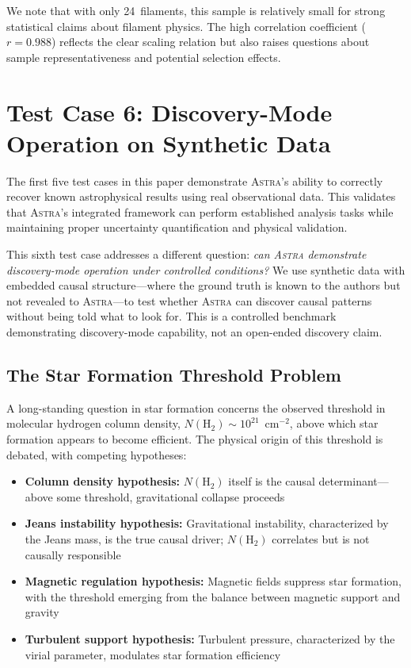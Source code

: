 \documentclass[fleqn,usenatbib]{mnras}
\newcommand{\astra}{\textsc{Astra}\xspace}
\newcommand{\nh}{N(\mathrm{H}_2)}
\begin{document}
We note that with only 24~filaments, this sample is relatively small for strong statistical claims about filament physics.
The high correlation coefficient ($r = 0.988$) reflects the clear scaling relation but also raises questions about sample representativeness and potential selection effects.

\section{Test Case 6: Discovery-Mode Operation on Synthetic Data}
\label{sec:tc6}

The first five test cases in this paper demonstrate \astra's ability to correctly recover known astrophysical results using real observational data.
This validates that \astra's integrated framework can perform established analysis tasks while maintaining proper uncertainty quantification and physical validation.

This sixth test case addresses a different question: \emph{can \astra demonstrate discovery-mode operation under controlled conditions?}
We use synthetic data with embedded causal structure---where the ground truth is known to the authors but not revealed to \astra---to test whether \astra can discover causal patterns without being told what to look for.
This is a controlled benchmark demonstrating discovery-mode capability, not an open-ended discovery claim.

\subsection{The Star Formation Threshold Problem}
\label{sec:tc6:problem}

A long-standing question in star formation concerns the observed threshold in molecular hydrogen column density, $\nh \sim 10^{21}$~cm$^{-2}$, above which star formation appears to become efficient.
The physical origin of this threshold is debated, with competing hypotheses:
\begin{itemize}
  \item \textbf{Column density hypothesis:} $\nh$ itself is the causal determinant---above some threshold, gravitational collapse proceeds
  \item \textbf{Jeans instability hypothesis:} Gravitational instability, characterized by the Jeans mass, is the true causal driver; $\nh$ correlates but is not causally responsible
  \item \textbf{Magnetic regulation hypothesis:} Magnetic fields suppress star formation, with the threshold emerging from the balance between magnetic support and gravity
  \item \textbf{Turbulent support hypothesis:} Turbulent pressure, characterized by the virial parameter, modulates star formation efficiency
\end{itemize}
\end{document}
